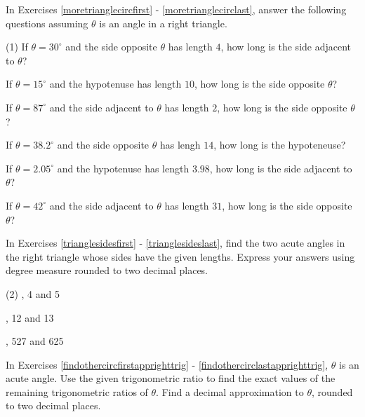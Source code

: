 In Exercises \ref{moretrianglecircfirst} - \ref{moretrianglecirclast}, answer the following questions assuming  $\theta$ is an angle in a right triangle.

\begin{tasks}[resume](1)
\task  If $\theta = 30^{\circ}$ and the side opposite $\theta$ has length $4$, how long is the side adjacent to $\theta$? \label{moretrianglecircfirst}

\task  If $\theta = 15^{\circ}$ and the hypotenuse has length $10$, how long is the side opposite $\theta$?

\task  If $\theta = 87^{\circ}$ and the side adjacent to $\theta$ has length $2$, how long is the side opposite $\theta$?

\task  If $\theta = 38.2^{\circ}$ and the side opposite $\theta$ has lengh $14$, how long is the hypoteneuse?

\task  If $\theta = 2.05^{\circ}$ and the hypotenuse has length $3.98$, how long is the side adjacent to $\theta$?

\task  If $\theta = 42^{\circ}$ and the side adjacent to $\theta$ has length $31$, how long is the side opposite $\theta$? \label{moretrianglecirclast}

\end{tasks}

In Exercises \ref{trianglesidesfirst} - \ref{trianglesideslast}, find the two acute angles in the right triangle whose sides have the given lengths.  Express your answers using degree measure rounded to two decimal places.

\begin{tasks}[resume](2)
, 4 and 5 \label{trianglesidesfirst}

, 12 and 13

, 527 and 625 \label{trianglesideslast}

\end{tasks}

In Exercises \ref{findothercircfirstapprighttrig} - \ref{findothercirclastapprighttrig}, $\theta$ is an acute angle.  Use the given trigonometric ratio to find the exact values of the remaining trigonometric ratios of $\theta$.  Find a decimal approximation to $\theta$, rounded to two decimal places.

